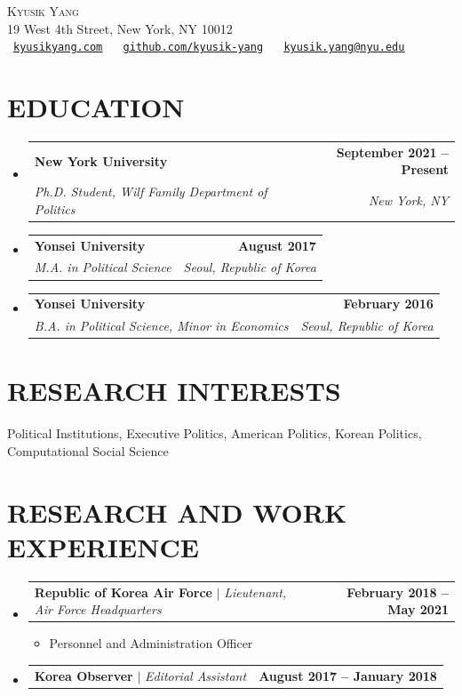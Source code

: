\documentclass[a4paper,11pt]{article}
\makeatletter
\newcommand{\resumeItem}[1]{
  \item\small{
    {#1 \vspace{-2pt}}
  }
}
\newcommand{\resumeSubheading}[4]{
  \vspace{-2pt}\item
    \begin{tabular*}{1.0\textwidth}[t]{l@{\extracolsep{\fill}}r}
      \textbf{#1} & \textbf{\small #2} \\
      \textit{\small#3} & \textit{\small #4} \\
    \end{tabular*}\vspace{-7pt}
}
\newcommand{\resumeProjectHeading}[2]{
    \item
    \begin{tabular*}{1.001\textwidth}{l@{\extracolsep{\fill}}r}
      \small#1 & \textbf{\small #2}\\
    \end{tabular*}\vspace{-7pt}
}
\newcommand{\resumeSubHeadingListStart}{\begin{itemize}[leftmargin=0.0in, label={}]}
\newcommand{\resumeSubHeadingListEnd}{\end{itemize}}
\newcommand{\resumeItemListStart}{\begin{itemize}}
\newcommand{\resumeItemListEnd}{\end{itemize}\vspace{-5pt}}
\makeatother
\begin{document}
\begin{center}
    {\Huge \scshape Kyusik Yang} \\[5pt]
    19 West 4th Street, New York, NY 10012 \\[3pt]

    \raisebox{-0.2\height}{\faUser}\ \href{https://kyusikyang.com}{\texttt{\underline{kyusikyang.com}}} ~
    \raisebox{-0.2\height}{\faGithub}\ \href{https://github.com/kyusik-yang}{\texttt{\underline{github.com/kyusik-yang}}} ~
    \raisebox{-0.2\height}{\faEnvelope}\ \href{mailto:kyusik.yang@nyu.edu}{\texttt{\underline{kyusik.yang@nyu.edu}}}

    \vspace{-3pt}
\end{center}


\section{EDUCATION}
  \resumeSubHeadingListStart
    \resumeSubheading
      {New York University}{September 2021 -- Present}
      {Ph.D. Student, Wilf Family Department of Politics}{New York, NY}
    \resumeSubheading
      {Yonsei University}{August 2017}
      {M.A. in Political Science}{Seoul, Republic of Korea}
    \resumeSubheading
      {Yonsei University}{February 2016}
      {B.A. in Political Science, Minor in Economics}{Seoul, Republic of Korea} \vspace{0pt}
  \resumeSubHeadingListEnd

\section{RESEARCH INTERESTS}
Political Institutions, Executive Politics, American Politics, Korean Politics, Computational Social Science
 \vspace{0pt}




\section{RESEARCH AND WORK EXPERIENCE}
    \vspace{-4pt}
    \resumeSubHeadingListStart
      \resumeProjectHeading
          {\textbf{Republic of Korea Air Force} $|$ \emph{Lieutenant, Air Force Headquarters}}{February 2018 -- May 2021}
           \resumeItemListStart
            \resumeItem{Personnel and Administration Officer}
          \resumeItemListEnd
          \vspace{-15pt}
      \resumeProjectHeading
          {\textbf{Korea Observer} $|$ \emph{Editorial Assistant}}{August 2017 -- January 2018}
    \resumeSubHeadingListEnd
\vspace{0pt}
\end{document}
